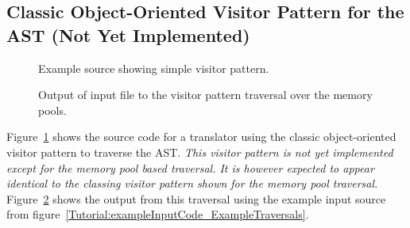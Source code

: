 \subsection{Classic Object-Oriented Visitor Pattern for the AST (Not Yet Implemented)}

\begin{figure}[!h]
{\indent
{\mySmallFontSize


\begin{latexonly}
   
\end{latexonly}

\begin{htmlonly}
   
\end{htmlonly}

}
}
\caption{Example source showing simple visitor pattern.}
\label{Tutorial:exampleClassicVisitorPattern}
\end{figure}


\begin{figure}[!h]
{\indent
{\mySmallFontSize


\begin{latexonly}
   
\end{latexonly}

\begin{htmlonly}
   
\end{htmlonly}

}
}
\caption{Output of input file to the visitor pattern traversal over the memory pools.}
\label{Tutorial:exampleOutput_ClassicVisitorPattern}
\end{figure}

Figure~\ref{Tutorial:exampleClassicVisitorPattern} shows the source code 
for a translator using the classic object-oriented visitor pattern 
to traverse the AST.  {\em This visitor pattern is not yet implemented
except for the memory pool based traversal.  It is however expected
to appear identical to the classing visitor pattern shown for the 
memory pool traversal.} 
Figure~\ref{Tutorial:exampleOutput_ClassicVisitorPattern} shows the 
output from this traversal using the example input source from 
figure~\ref{Tutorial:exampleInputCode_ExampleTraversals}.



